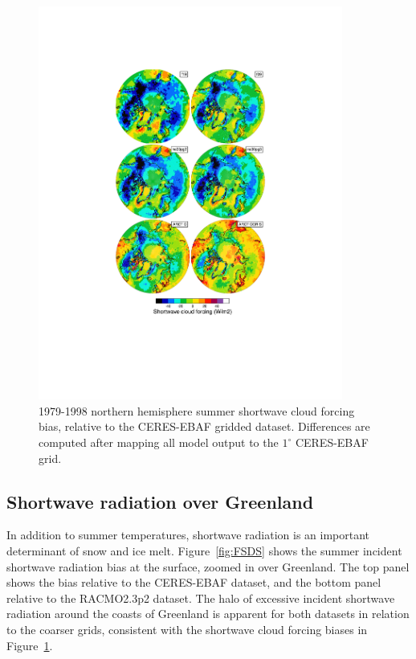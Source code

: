 \documentclass[draft]{agujournal2019}
\begin{document}
\begin{figure}[t]
\begin{center}
         \includegraphics[width=100mm]{figs/temp_contours_diffCERES_SWCF.pdf}
\end{center}
\caption{1979-1998 northern hemisphere summer shortwave cloud forcing bias, relative to the CERES-EBAF gridded dataset. Differences are computed after mapping all model output to the $1^{\circ}$ CERES-EBAF grid.}
\label{fig:SWCF}
\end{figure}

\subsection{Shortwave radiation over Greenland}

In addition to summer temperatures, shortwave radiation is an important determinant of snow and ice melt. Figure~\ref{fig:FSDS} shows the summer incident shortwave radiation bias at the surface, zoomed in over Greenland. The top panel shows the bias relative to the CERES-EBAF dataset, and the bottom panel relative to the RACMO2.3p2 dataset.
The halo of excessive incident shortwave radiation around the coasts of Greenland is apparent for both datasets in relation to the coarser grids, consistent with the shortwave cloud forcing biases in Figure~\ref{fig:SWCF}.
\end{document}
